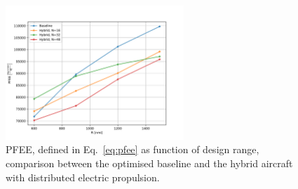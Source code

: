 \begin{figure}[!h]
	\centering
	\includegraphics[keepaspectratio, width=0.6\textwidth]{images/chap3/hybrid_dep_optim_pfee_comp}
	\caption{PFEE, defined in Eq.~\eqref{eq:pfee} as function of design range, comparison between the optimised baseline and the hybrid aircraft with distributed electric propulsion.}
	\label{fig:hybrid_dep_optim_pfee_comp}
\end{figure}


